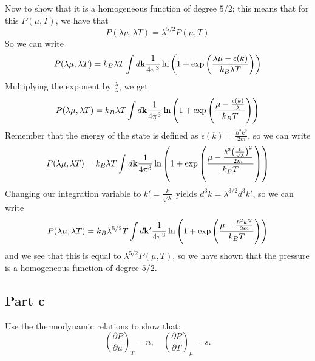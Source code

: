 \documentclass[12pt]{article}
\begin{document}
Now to show that it is a homogeneous function of degree \( 5/2 \); this means that for this \( P(\mu, T) \), we have that
\begin{equation}
    P(\lambda \mu, \lambda T) = \lambda^{5/2} P(\mu, T)
\end{equation}
So we can write
\begin{equation}
    P(\lambda \mu, \lambda T) = k_B \lambda T \int d \vb{k} \frac{1}{4\pi^3} \ln \left( 1 + \exp \left( \frac{\lambda \mu - \epsilon(k)}{k_B \lambda T} \right) \right)
\end{equation}
Multiplying the exponent by \( \frac{\lambda}{\lambda} \), we get
\begin{equation}
    P(\lambda \mu, \lambda T) = k_B \lambda T \int d \vb{k} \frac{1}{4\pi^3} \ln \left( 1 + \exp \left( \frac{\mu - \frac{\epsilon(k)}{\lambda}}{k_B T} \right) \right)
\end{equation}
Remember that the energy of the state is defined as \( \epsilon(k) = \frac{\hbar^2 k^2}{2m} \), so we can write
\begin{equation}
    P(\lambda \mu, \lambda T) = k_B \lambda T \int d \vb{k} \frac{1}{4\pi^3} \ln \left( 1 + \exp \left( \frac{\mu - \frac{\hbar^2 \left(\frac{k}{\sqrt{\lambda}}\right)^2}{2m}}{k_B T} \right) \right)
\end{equation}
Changing our integration variable to \( k' = \frac{k}{\sqrt{\lambda}} \) yields \( d^3k = \lambda^{3/2} d^3k' \), so we can write
\begin{equation}
    P(\lambda \mu, \lambda T) = k_B \lambda^{5/2} T \int d \vb{k'} \frac{1}{4\pi^3} \ln \left( 1 + \exp \left( \frac{\mu - \frac{\hbar^2 k'^2}{2m}}{k_B T} \right) \right)
\end{equation}
and we see that this is equal to \( \lambda^{5/2} P(\mu, T) \), so we have shown that the pressure is a homogeneous function of degree \( 5/2 \).
\subsection{Part c}
Use the thermodynamic relations to show that:
\[
\left( \frac{\partial P}{\partial \mu} \right)_T = n, \quad \left( \frac{\partial P}{\partial T} \right)_\mu = s.
\]
\end{document}
